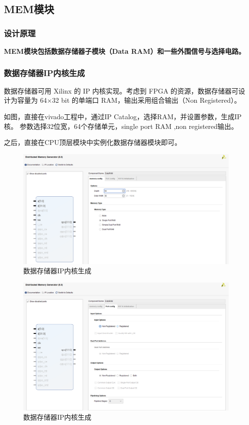 \documentclass[12pt,hyperref,a4paper,UTF8]{ctexart}
\begin{document}
\newpage

\subsection{MEM模块}
\subsubsection*{\Large 设计原理}
\normalsize

\textbf{MEM模块包括数据存储器子模块（Data RAM）和一些外围信号与选择电路。}

\subsubsection*{数据存储器IP内核生成}


数据存储器可用 Xilinx 的 IP 内核实现。考虑到 FPGA 的资源，数据存储器可设计为容量为 64×32 bit
的单端口 RAM，输出采用组合输出（Non Registered）。

如图，直接在vivado工程中，通过IP Catalog，选择RAM，并设置参数，生成IP核。
参数选择32位宽，64个存储单元，single port RAM ,non registered输出。

之后，直接在CPU顶层模块中实例化数据存储器模块即可。


    \begin{figure}[H]
        \centering
        \includegraphics[width=1\textwidth]{figures/fig/image16.png}
        \caption{数据存储器IP内核生成}
    \end{figure}


    \begin{figure}[H]
        \centering
        \includegraphics[width=1\textwidth]{figures/fig/image17.png}
        \caption{数据存储器IP内核生成}
    \end{figure}
\end{document}
